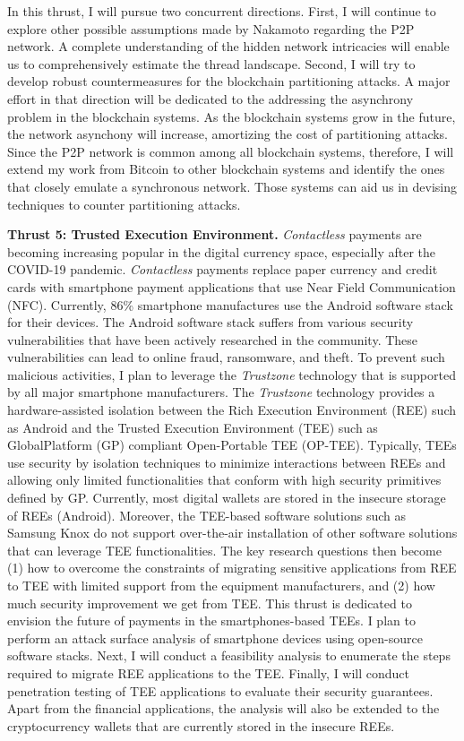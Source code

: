 \documentclass{NSF}
\newcommand{\BfPara}[1]{{\noindent\textbf{#1.}}\xspace}
\begin{document}
In this thrust, I will pursue two concurrent directions. First, I will continue to explore other possible assumptions made by Nakamoto regarding the P2P network. A complete understanding of the hidden network intricacies will enable us to comprehensively estimate the thread landscape. Second, I will try to develop robust countermeasures for the blockchain partitioning attacks. A major effort in that direction will be dedicated to the addressing the asynchrony problem in the blockchain systems. As the blockchain systems grow in the future, the network asynchony will increase, amortizing the cost of partitioning attacks. Since the P2P network is common among all blockchain systems, therefore, I will extend my work from Bitcoin to other blockchain systems and identify the ones that closely emulate a synchronous network. Those systems can aid us in devising techniques to counter partitioning attacks. 


\BfPara{Thrust 5: Trusted Execution Environment} {\em Contactless} payments are becoming increasing popular in the digital currency space, especially after the COVID-19 pandemic. {\em Contactless} payments replace paper currency and credit cards with smartphone payment applications that use Near Field Communication (NFC). Currently, 86\% smartphone manufactures use the Android software stack for their devices. The Android software stack suffers from various security vulnerabilities that have been actively researched in the community. These vulnerabilities can lead to online fraud, ransomware, and theft. To prevent such malicious activities, I plan to leverage the {\em Trustzone} technology that is supported by all major smartphone manufacturers. The {\em Trustzone} technology provides a hardware-assisted isolation between the Rich Execution Environment (REE) such as Android and the Trusted Execution Environment (TEE) such as GlobalPlatform (GP) compliant Open-Portable TEE (OP-TEE). Typically, TEEs use security by isolation techniques to minimize interactions between REEs and allowing only limited functionalities that conform with high security primitives defined by GP. Currently, most digital wallets are stored in the insecure storage of REEs (Android). Moreover, the TEE-based software solutions such as Samsung Knox do not support over-the-air installation of other software solutions that can leverage TEE functionalities. The key research questions then become (1) how to overcome the constraints of migrating sensitive applications from REE to TEE with limited support from the equipment manufacturers, and (2) how much security improvement we get from TEE. This thrust is dedicated to envision the future of payments in the smartphones-based TEEs. I plan to perform an attack surface analysis of smartphone devices using open-source software stacks. Next, I will conduct a feasibility analysis to enumerate the steps required to migrate REE applications to the TEE. Finally, I will conduct penetration testing of TEE applications to evaluate their security guarantees. Apart from the financial applications, the analysis will also be extended to the cryptocurrency wallets that are currently stored in the insecure REEs. 
\end{document}
